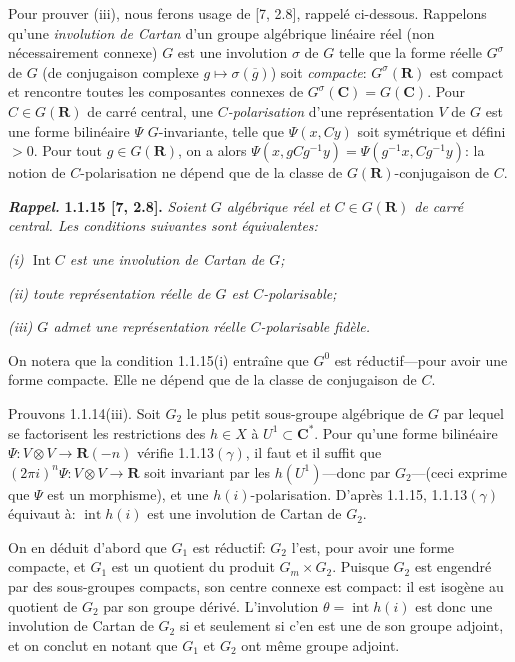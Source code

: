\documentclass[10pt,a4paper]{article}
\begin{document}
Pour prouver (iii), nous ferons usage de {[}7, 2.8{]}, rappelé ci-dessous. Rappelons qu'une \emph{involution de Cartan} d'un groupe algébrique linéaire réel (non nécessairement connexe) \(G\) est une involution \(\sigma\) de \(G\) telle que la forme réelle \(G^\sigma\) de \(G\) (de conjugaison complexe \(g\mapsto\sigma(\overline g)\)) soit \emph{compacte}: \(G^\sigma(\mathbf R)\) est compact et rencontre toutes les composantes connexes de \(G^\sigma(\mathbf C)=G(\mathbf C)\). Pour \(C\in G(\mathbf R)\) de carré central, une \emph{\(C\)-polarisation} d'une représentation \(V\) de \(G\) est une forme bilinéaire \(\Psi\) \(G\)-invariante, telle que \(\Psi(x,Cy)\) soit symétrique et défini \(>0\). Pour tout \(g\in G(\mathbf R)\), on a alors \(\Psi(x,gCg^{-1}y)=\Psi(g^{-1}x,Cg^{-1}y)\): la notion de \(C\)-polarisation ne dépend que de la classe de \(G(\mathbf R)\)-conjugaison de \(C\).

\textbf{\emph{Rappel.}} \textbf{1.1.15 {[}7, 2.8{]}.} \emph{Soient \(G\) algébrique réel et \(C\in G(\mathbf R)\) de carré central. Les conditions suivantes sont équivalentes:}

\emph{(i) \(\operatorname{Int}C\) est une involution de Cartan de \(G\);}

\emph{(ii) toute représentation réelle de \(G\) est \(C\)-polarisable;}

\emph{(iii) \(G\) admet une représentation réelle \(C\)-polarisable fidèle.}

On notera que la condition 1.1.15(i) entraîne que \(G^0\) est réductif---pour avoir une forme compacte. Elle ne dépend que de la classe de conjugaison de \(C\).

Prouvons 1.1.14(iii). Soit \(G_2\) le plus petit sous-groupe algébrique de \(G\) par lequel se factorisent les restrictions des \(h\in X\) à \(U^1\subset\mathbf C^*\). Pour qu'une forme bilinéaire \(\Psi:V\otimes V\to\mathbf R(-n)\) vérifie 1.1.13\((\gamma)\), il faut et il suffit que \((2\pi i)^n\Psi:V\otimes V\to\mathbf R\) soit invariant par les \(h(U^1)\)---donc par \(G_2\)---(ceci exprime que \(\Psi\) est un morphisme), et une \(h(i)\)-polarisation. D'après 1.1.15, 1.1.13\((\gamma)\) équivaut à: \(\operatorname{int}h(i)\) est une involution de Cartan de \(G_2\).

On en déduit d'abord que \(G_1\) est réductif: \(G_2\) l'est, pour avoir une forme compacte, et \(G_1\) est un quotient du produit \(G_m\times G_2\). Puisque \(G_2\) est engendré par des sous-groupes compacts, son centre connexe est compact: il est isogène au quotient de \(G_2\) par son groupe dérivé. L'involution \(\theta=\operatorname{int}h(i)\) est donc une involution de Cartan de \(G_2\) si et seulement si c'en est une de son groupe adjoint, et on conclut en notant que \(G_1\) et \(G_2\) ont même groupe adjoint.
\end{document}
